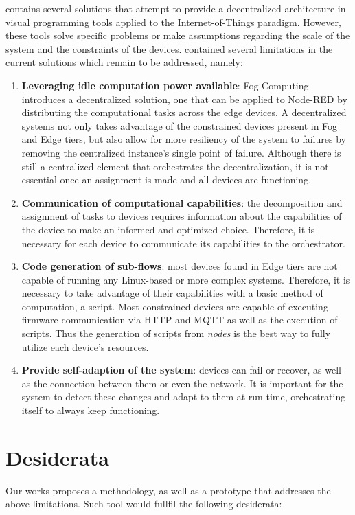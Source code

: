  contains several solutions that attempt to provide a decentralized architecture in visual programming tools applied to the Internet-of-Things paradigm. However, these tools solve specific problems or make assumptions regarding the scale of the system and the constraints of the devices.
 contained several limitations in the current solutions which remain to be addressed, namely:
\begin{enumerate}
    \item \textbf{Leveraging idle computation power available}: Fog Computing introduces a decentralized solution, one that can be applied to Node-RED by distributing the computational tasks across the edge devices. A decentralized systems not only takes advantage of the constrained devices present in Fog and Edge tiers, but also allow for more resiliency of the system to failures by removing the centralized instance's single point of failure. Although there is still a centralized element that orchestrates the decentralization, it is not essential once an assignment is made and all devices are functioning.
    \item \textbf{Communication of computational capabilities}: the decomposition and assignment of tasks to devices requires information about the capabilities of the device to make an informed and optimized choice. Therefore, it is necessary for each device to communicate its capabilities to the orchestrator.
    \item \textbf{Code generation of sub-flows}: most devices found in Edge tiers are not capable of running any Linux-based or more complex systems. Therefore, it is necessary to take advantage of their capabilities with a basic method of computation, a script. Most constrained devices are capable of executing firmware communication via HTTP and MQTT as well as the execution of scripts. Thus the generation of scripts from \textit{nodes} is the best way to fully utilize each device's resources. 
    \item \textbf{Provide self-adaption of the system}: devices can fail or recover, as well as the connection between them or even the network. It is important for the system to detect these changes and adapt to them at run-time, orchestrating itself to always keep functioning. 
\end{enumerate}

\section{Desiderata}\label{sec:desiderata}
Our works proposes a methodology, as well as a prototype that addresses the above limitations. Such tool would fullfil the following desiderata:

